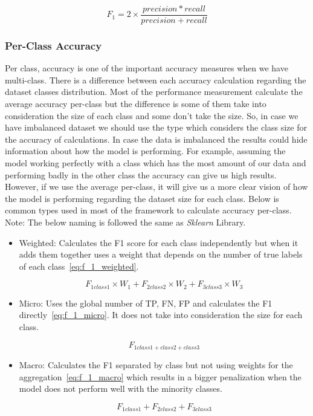 \begin{equation}\label{eq:f_1}
F_1= 2 \times \frac{precision*recall}{precision+recall}
\end{equation}%
 
\subsubsection{Per-Class Accuracy}

Per class, accuracy is one of the important accuracy measures when we have multi-class. There is a difference between each accuracy calculation regarding the dataset classes distribution. Most of the performance measurement calculate the average accuracy per-class but the difference is some of them take into consideration the size of each class and some don’t take the size. So, in case we have imbalanced dataset we should use the type which considers the class size for the accuracy of calculations. In case the data is imbalanced the results could hide information about how the model is performing. For example, assuming the model working perfectly with a class which has the most amount of our data and performing badly in the other class the accuracy can give us high results. However, if we use the average per-class, it will give us a more clear vision of how the model is performing regarding the dataset size for each class. Below is common types used in most of the framework to calculate accuracy per-class. Note: The below naming is followed the same as \textit{Sklearn} Library.

\begin{itemize}
 \item Weighted: Calculates the F1 score for each class independently but when it adds them together uses a weight that depends on the number of true labels of each class~\eqref{eq:f_1_weighted}.

\begin{equation}\label{eq:f_1_weighted}
F_{1 class1}\times W_1 + F_{2 class2}\times W_2 + F_{3 class3}\times W_3
\end{equation}%

 \item Micro: Uses the global number of TP, FN, FP and calculates the F1 directly~\eqref{eq:f_1_micro}. It does not take into consideration the size for each class.

 \begin{equation}\label{eq:f_1_micro}
F_{1 class1+class2+class3}
\end{equation}%
 \item Macro: Calculates the F1 separated by class but not using weights for the aggregation~\eqref{eq:f_1_macro}  which results in a bigger penalization when the model does not perform well with the minority classes.

\begin{equation}\label{eq:f_1_macro}
F_{1 class1} + F_{2 class2} + F_{3 class3}
\end{equation}%
\end{itemize}

